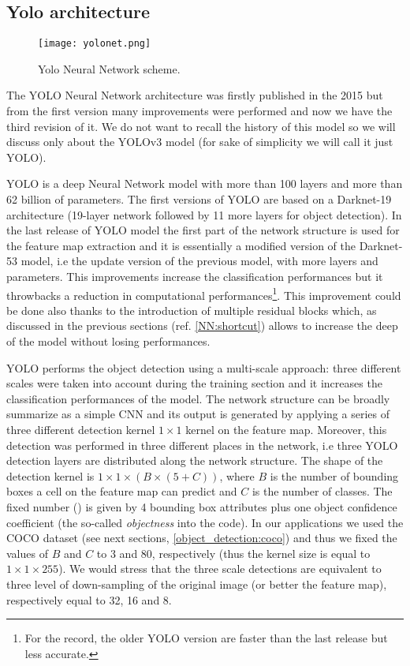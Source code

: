 \documentclass{standalone}
\begin{document}
\subsection[Yolo]{Yolo architecture}\label{obj_detection:yolo}

\begin{center}
\begin{figure}[htbp]
\centering
\texttt{[image: yolonet.png]}
\caption{Yolo Neural Network scheme.
}
\label{fig:yolo}
\end{figure}
\end{center}

The YOLO Neural Network architecture was firstly published in the 2015 but from the first version many improvements were performed and now we have the third revision of it.
We do not want to recall the history of this model so we will discuss only about the YOLOv3 model (for sake of simplicity we will call it just YOLO).

YOLO is a deep Neural Network model with more than 100 layers and more than 62 billion of parameters.
The first versions of YOLO are based on a Darknet-19 architecture (19-layer network followed by 11 more layers for object detection).
In the last release of YOLO model the first part of the network structure is used for the feature map extraction and it is essentially a modified version of the Darknet-53 model, i.e the update version of the previous model, with more layers and parameters.
This improvements increase the classification performances but it throwbacks a reduction in computational performances\footnote{
For the record, the older YOLO version are faster than the last release but less accurate.
}.
This improvement could be done also thanks to the introduction of multiple residual blocks which, as discussed in the previous sections (ref. \ref{NN:shortcut}) allows to increase the deep of the model without losing performances.

YOLO performs the object detection using a multi-scale approach: three different scales were taken into account during the training section and it increases the classification performances of the model.
The network structure can be broadly summarize as a simple CNN and its output is generated by applying a series of three different detection kernel $1\times1$ kernel on the feature map.
Moreover, this detection was performed in three different places in the network, i.e three YOLO detection layers are distributed along the network structure.
The shape of the detection kernel is $1\times1\times(B\times(5 + C))$, where $B$ is the number of bounding boxes a cell on the feature map can predict and $C$ is the number of classes.
The fixed number () is given by 4 bounding box attributes plus one object confidence coefficient (the so-called \emph{objectness} into the code).
In our applications we used the COCO dataset (see next sections, \ref{object_detection:coco}) and thus we fixed the values of $B$ and $C$ to 3 and 80, respectively (thus the kernel size is equal to $1\times1\times255$).
We would stress that the three scale detections are equivalent to three level of down-sampling of the original image (or better the feature map), respectively equal to 32, 16 and 8.
\end{document}
